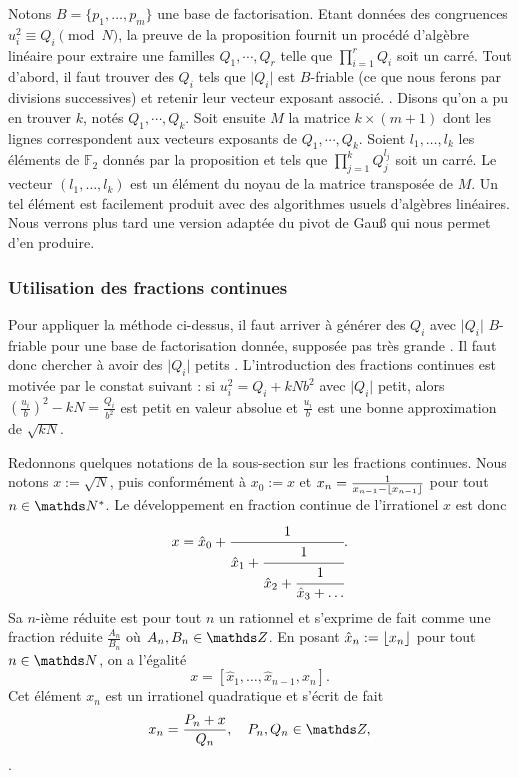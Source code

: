 Notons $B = \{p_1, \dots, p_m\}$ une base de factorisation. Etant données
des congruences $u_i^2 \equiv Q_i \pmod{N}$, la preuve de la proposition 
fournit un procédé d'algèbre linéaire pour extraire une familles $Q_1,
\cdots, Q_r$ telle que $\prod_{i=1}^r Q_i$ soit un carré. Tout d'abord,
il faut trouver des $Q_i$ tels que $ \lvert Q_i \rvert$ est $B$-friable
(ce que nous ferons par divisions successives) et retenir leur vecteur 
exposant associé. . 
Disons qu'on a pu en trouver $k$, notés $Q_1, \cdots, Q_k$.
Soit ensuite $M$ la matrice $k\times(m+1)$ dont les lignes correspondent
aux vecteurs exposants de $Q_{1}, \cdots, Q_{k}$. Soient $l_{1}, \dots,
l_{k}$ les éléments de $\mathbb{F}_2$ donnés par la proposition et tels que
$\prod_{j=1}^k Q_{j}^{l_j} $ soit un carré. Le vecteur $(l_1, \dots,
l_{k})$ est un élément du noyau de la matrice transposée de $M$. Un tel
élément est facilement produit avec des algorithmes usuels d'algèbres
linéaires. Nous verrons plus tard une version adaptée du pivot
de Gau\ss{} qui nous permet d'en produire.

\subsubsection{Utilisation des fractions continues}

Pour appliquer la méthode ci-dessus, il faut arriver à générer des $Q_i$ 
avec $\lvert  Q_i \rvert$ $B$-friable pour une base de factorisation donnée,
supposée \og{} pas très grande \fg. Il faut donc chercher à avoir des
$\lvert Q_i \rvert$ \og{} petits \fg. L'introduction des fractions continues
est motivée par le constat suivant : si $u_i^2 = Q_i + kNb^2$ avec $\lvert 
Q_i \rvert$ petit, alors $\left(\frac{u_i}{b}\right)^2 - kN = \frac{Q_i}{b^2}$
est petit en valeur absolue et $\frac{u_i}{b}$ est une bonne approximation de 
$\sqrt{kN}$.


Redonnons quelques notations de la sous-section  sur les fractions
continues. Nous notons $x := \sqrt{N}$, puis conformément à  $x_0 :=
x$ et $x_n = \frac{1}{x_{n-1}- \lfloor x_{n-1}\rfloor}$ pour tout $n\in \N^*$. Le
développement en fraction continue de l'irrationel $x$ est donc \[x = \hat{x}_0
+ \cfrac{1}{\hat{x}_1 + \cfrac{1}{\hat{x}_2 + \cfrac{1}{\hat{x}_3 + \dots}}}.\]
Sa $n$-ième réduite est pour tout $n$ un rationnel et s'exprime de fait comme
une fraction réduite $\frac{A_n}{B_n}$ où $A_n, B_n\in \Z$.  En posant
$\hat{x}_n := \lfloor x_n\rfloor$ pour tout $n\in \N$, on a l'égalité  \[x =
[\hat{x}_1, \dots, \hat{x}_{n-1}, x_n].\] Cet élément $x_n$ est un irrationel
quadratique et s'écrit de fait  \[x_n = \frac{P_n + x}{Q_n},\quad P_n,
Q_n\in \Z,\]. 

